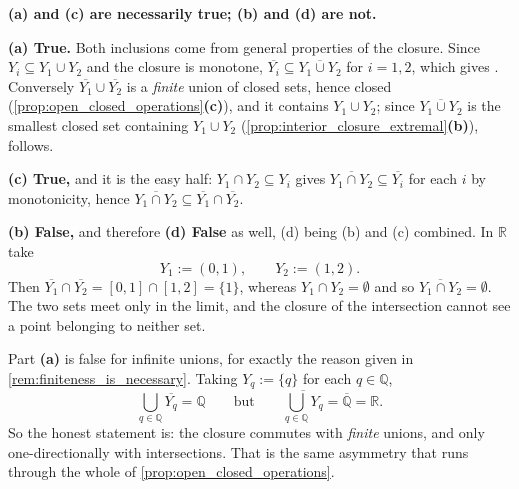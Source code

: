 
\begin{exercisesolution}
\label{sol:closure_multiple_choice}
\textbf{(a) and (c) are necessarily true; (b) and (d) are not.}

\textbf{(a) True.} Both inclusions come from general properties of the closure. Since
$Y_i \subseteq Y_1 \cup Y_2$ and the closure is monotone,
$\overline{Y_i} \subseteq \overline{Y_1\cup Y_2}$ for $i=1,2$, which gives \qt{$\supseteq$}.
Conversely $\overline{Y_1}\cup\overline{Y_2}$ is a \emph{finite} union of closed sets, hence
closed (\cref{prop:open_closed_operations}\textbf{(c)}), and it contains $Y_1\cup Y_2$; since
$\overline{Y_1\cup Y_2}$ is the smallest closed set containing $Y_1 \cup Y_2$
(\cref{prop:interior_closure_extremal}\textbf{(b)}), \qt{$\subseteq$} follows.

\textbf{(c) True,} and it is the easy half: $Y_1\cap Y_2 \subseteq Y_i$ gives
$\overline{Y_1\cap Y_2} \subseteq \overline{Y_i}$ for each $i$ by monotonicity, hence
$\overline{Y_1\cap Y_2} \subseteq \overline{Y_1}\cap\overline{Y_2}$.

\textbf{(b) False,} and therefore \textbf{(d) False} as well, (d) being (b) and (c) combined. In
$\mathbb{R}$ take
\[Y_1 := (0,1), \qquad Y_2 := (1,2).\]
Then $\overline{Y_1}\cap\overline{Y_2} = [0,1]\cap[1,2] = \{1\}$, whereas
$Y_1\cap Y_2 = \emptyset$ and so $\overline{Y_1\cap Y_2} = \emptyset$. The two sets meet only in
the limit, and the closure of the intersection cannot see a point belonging to neither set.

\begin{remark}
Part \textbf{(a)} is false for infinite unions, for exactly the reason given in
\cref{rem:finiteness_is_necessary}. Taking $Y_q := \{q\}$ for each $q \in \mathbb{Q}$,
\[\bigcup_{q\in\mathbb{Q}}\overline{Y_q} = \mathbb{Q}
  \qquad\text{but}\qquad
  \overline{\bigcup_{q\in\mathbb{Q}}Y_q} = \overline{\mathbb{Q}} = \mathbb{R}.\]
So the honest statement is: the closure commutes with \emph{finite} unions, and only
one-directionally with intersections. That is the same asymmetry that runs through the whole of
\cref{prop:open_closed_operations}.
\end{remark}
\end{exercisesolution}

